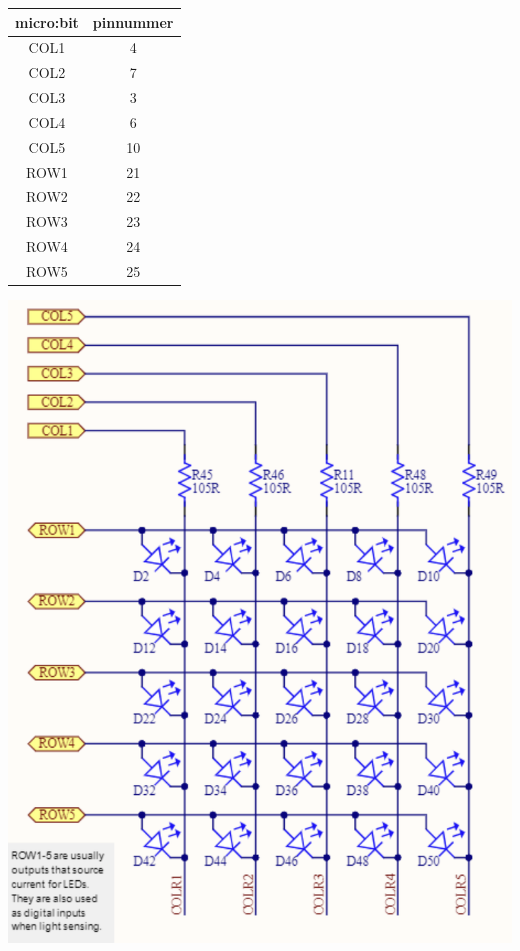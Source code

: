 \begin{minipage}{\textwidth} 
	\begin{minipage}[b]{0.49\textwidth}
		\centering
		\begin{tabular}{|c|c|} \hline
			\textbf{micro:bit} & \textbf{pinnummer} \\ \hline
			COL1	 & 4  \\  \hline
			COL2	 & 7  \\  \hline
			COL3	 & 3  \\  \hline
			COL4	 & 6  \\  \hline
			COL5	 & 10  \\  \hline
			ROW1	 & 21  \\  \hline
			ROW2	 & 22  \\  \hline
			ROW3	 & 23  \\  \hline
			ROW4	 & 24  \\  \hline
			ROW5	 & 25  \\  \hline
			
		\end{tabular}
	\end{minipage}
	\hfill
	\begin{minipage}[b]{0.49\textwidth}
		\centering
		\includegraphics[width=0.7 \linewidth]{figuren/LedMatrixV2}
		\label{fig:matrix}
	\end{minipage}
\end{minipage}

